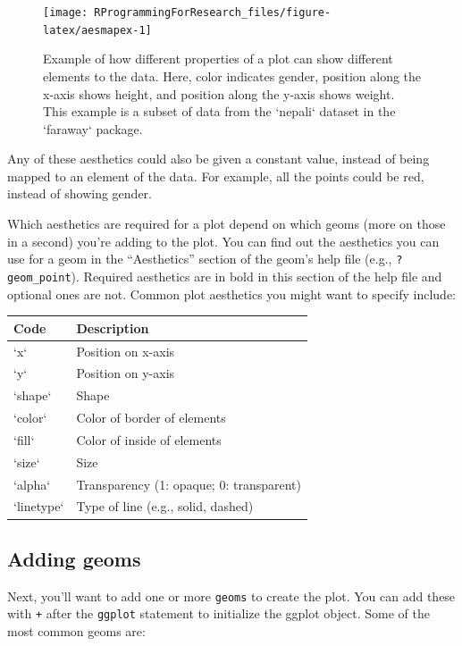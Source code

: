 \documentclass[]{book}
\makeatletter
\newenvironment{kframe}{%
\medskip{}
\setlength{\fboxsep}{.8em}
 \def\at@end@of@kframe{}%
 \ifinner\ifhmode%
  \def\at@end@of@kframe{\end{minipage}}%
  \begin{minipage}{\columnwidth}%
 \fi\fi%
 \def\FrameCommand##1{\hskip\@totalleftmargin \hskip-\fboxsep
 \colorbox{shadecolor}{##1}\hskip-\fboxsep
     \hskip-\linewidth \hskip-\@totalleftmargin \hskip\columnwidth}%
 \MakeFramed {\advance\hsize-\width
   \@totalleftmargin\z@ \linewidth\hsize
   \@setminipage}}%
 {\par\unskip\endMakeFramed%
 \at@end@of@kframe}
\newenvironment{rmdblock}[1]
  {
  \begin{itemize}
  \renewcommand{\labelitemi}{
    \raisebox{-.7\height}[0pt][0pt]{
      {\setkeys{Gin}{width=3em,keepaspectratio}\texttt{[image: images/\#1]}}
    }
  }
  \setlength{\fboxsep}{1em}
  \begin{kframe}
  \item
  }
  {
  \end{kframe}
  \end{itemize}
  }
\newenvironment{rmdnote}
  {\begin{rmdblock}{note}}
  {\end{rmdblock}}
\theoremstyle{definition}
\theoremstyle{definition}
\theoremstyle{definition}
\theoremstyle{remark}
\makeatother
\begin{document}
\begin{figure}

{\centering \texttt{[image: RProgrammingForResearch\_files/figure-latex/aesmapex-1]} 

}

\caption{Example of how different properties of a plot can show different elements to the data. Here, color indicates gender, position along the x-axis shows height, and position along the y-axis shows weight. This example is a subset of data from the `nepali` dataset in the `faraway` package.}\label{fig:aesmapex}
\end{figure}

\begin{rmdnote}
Any of these aesthetics could also be given a constant value, instead of
being mapped to an element of the data. For example, all the points
could be red, instead of showing gender.
\end{rmdnote}

Which aesthetics are required for a plot depend on which geoms (more on
those in a second) you're adding to the plot. You can find out the
aesthetics you can use for a geom in the ``Aesthetics'' section of the
geom's help file (e.g., \texttt{?geom\_point}). Required aesthetics are
in bold in this section of the help file and optional ones are not.
Common plot aesthetics you might want to specify include:

\begin{tabular}{l|l}
\hline
Code & Description\\
\hline
`x` & Position on x-axis\\
\hline
`y` & Position on y-axis\\
\hline
`shape` & Shape\\
\hline
`color` & Color of border of elements\\
\hline
`fill` & Color of inside of elements\\
\hline
`size` & Size\\
\hline
`alpha` & Transparency (1: opaque; 0: transparent)\\
\hline
`linetype` & Type of line (e.g., solid, dashed)\\
\hline
\end{tabular}

\subsection{Adding geoms}\label{adding-geoms}

Next, you'll want to add one or more \texttt{geoms} to create the plot.
You can add these with \texttt{+} after the \texttt{ggplot} statement to
initialize the ggplot object. Some of the most common geoms are:
\end{document}
